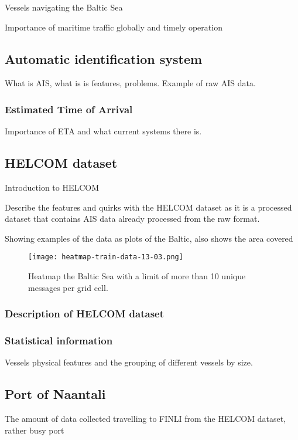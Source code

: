 \documentclass[../main.tex]{subfiles}
\begin{document}
Vessels navigating the Baltic Sea

Importance of maritime traffic globally and timely operation


\subsection{Automatic identification system}

What is AIS, what is is features, problems. Example of raw AIS data.

\subsubsection{Estimated Time of Arrival}

Importance of ETA and what current systems there is.

\subsection{HELCOM dataset}

Introduction to HELCOM

Describe the features and quirks with the HELCOM dataset as it is a processed dataset that contains AIS data already processed from the raw format.

Showing examples of the data as plots of the Baltic, also shows the area covered

\begin{figure}[h]
\centering
\texttt{[image: heatmap-train-data-13-03.png]}
\caption{Heatmap the Baltic Sea with a limit of more than 10 unique messages per grid cell.}
\label{fig:heatmap}
\end{figure}

\subsubsection{Description of HELCOM dataset}

\subsubsection{Statistical information}

Vessels physical features and the grouping of different vessels by size.

\subsection{Port of Naantali}

The amount of data collected travelling to FINLI from the HELCOM dataset, rather busy port
\end{document}
